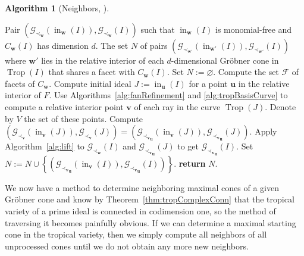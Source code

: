 \documentclass[
  paper=a4,
  titlepage,
  bibliography=totoc,
  listof=totoc,
  pagesize=pdftex
]{scrartcl}
\numberwithin{figure}{section}
\numberwithin{equation}{section}
\numberwithin{table}{section}
\let\vec\mathbf
\DeclareMathOperator{\Trop}{Trop}
\DeclareMathOperator{\initial}{in}
\theoremstyle{definition}
\newtheorem{algo}[definition]{Algorithm}
\numberwithin{definition}{section}
\begin{document}
\begin{algo}[Neighbors, {\cite[Algorithm~4.10]{compTropVar}}]\
  \label{alg:neighbors}
  \begin{algorithmic}[1]
    \Require Pair $(\mathcal G_{\prec_{\vec w}}(\initial_{\vec w}(I)), \mathcal
      G_{\prec_{\vec w}}(I))$ such that $\initial_{\vec w}(I)$ is monomial-free and
      $C_{\vec w}(I)$ has dimension $d$.
    \Ensure The set $N$ of pairs $(\mathcal G_{\prec_{\vec w'}}(\initial_{\vec w'}(I)),
      \mathcal G_{\prec_{\vec w'}}(I))$ where $\vec w'$ lies in the relative interior of
      each $d$-dimensional Gröbner cone in $\Trop(I)$ that shares a facet with $C_{\vec
      w}(I)$.
    \State Set $N := \varnothing$.
    \State Compute the set $\mathcal F$ of facets of $C_{\vec w}$.
    \For{$F \in \mathcal F$}
      \State Compute initial ideal $J := \initial_{\vec u}(I)$ for a point $\vec u$ in the
        relative interior of $F$.
      \State Use Algorithms~\ref{alg:fanRefinement} and \ref{alg:tropBasisCurve} to compute
        a relative interior point $\vec v$ of each ray in the curve $\Trop(J)$. Denote by
        $V$ the set of these points.
        \label{alg:interiorPoints}
      \For{$\vec v \in V$}
        \State Compute $(\mathcal G_{\prec_{\vec v}}(\initial_{\vec v}(J)), \mathcal
          G_{\prec_{\vec v}}(J)) = (\mathcal G_{{\prec_{\vec v}}_{\vec u}}(\initial_{\vec
          v}(J)), \mathcal G_{{\prec_{\vec v}}_{\vec u}}(J))$.
        \State Apply Algorithm~\ref{alg:lift} to $\mathcal G_{\prec_{\vec w}}(I)$ and
          $\mathcal G_{{\prec_{\vec v}}_{\vec u}}(J)$ to get $\mathcal G_{{\prec_{\vec
          v}}_{\vec u}}(I)$.
        \State Set $N := N \cup \left\{ (\mathcal G_{{\prec_{\vec v}}_{\vec
          u}}(\initial_{\vec v}(I)), \mathcal G_{{\prec_{\vec v}}_{\vec u}}(I))
          \right\}$.
      \EndFor
    \EndFor
    \State\textbf{return} $N$.
  \end{algorithmic}
\end{algo}

We now have a method to determine neighboring maximal cones of a given Gröbner cone and
know by Theorem~\ref{thm:tropComplexConn} that the tropical variety of a prime ideal is
connected in codimension one, so the method of traversing it becomes painfully obvious. If
we can determine a maximal starting cone in the tropical variety, then we simply compute
all neighbors of all unprocessed cones until we do not obtain any more new neighbors.
\end{document}
